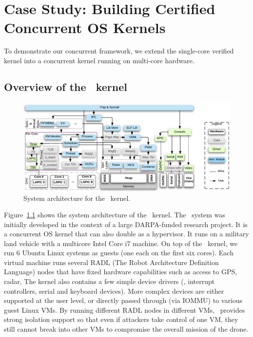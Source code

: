 \chapter{Case Study: Building Certified Concurrent OS Kernels}
\label{chap:conkernel}

To demonstrate our concurrent framework,
we extend the \mCTOS{} single-core verified kernel into a
concurrent kernel \cCTOS{} running on multi-core hardware.

\section{Overview of the \cCTOS\ kernel}
\label{sec:con:overview}

\begin{figure}[t]\centering
\includegraphics[scale=.78]{figs/sysarch}
\caption{System architecture for the \cCTOS\ kernel.}
\label{fig:sysarch}
\hrulefill
\end{figure}

Figure~\ref{fig:sysarch} shows the system architecture of the
\cCTOS\ kernel. The \cCTOS\ system was initially developed in the
context of a large DARPA-funded research project.  
It is a concurrent
OS kernel that can also double as a hypervisor.  It runs on a military
land vehicle with a multicore Intel Core i7 machine. On top of the
\cCTOS\ kernel, we run 6 Ubuntu Linux systems as guests (one each on
the first six cores). Each virtual machine runs several RADL (The
Robot Architecture Definition Language) nodes that have fixed hardware
capabilities such as access to GPS, radar, \etc{}  The kernel also
contains a few simple device drivers (\eg, interrupt controllers,
serial and keyboard devices). More complex devices are either
supported at the user level, or directly passed through (via
IOMMU) to various guest Linux VMs. By running different RADL nodes in
different VMs, \cCTOS\ provides strong isolation support so that even
if attackers take control of one VM, they still cannot break into
other VMs to compromise the overall mission of the drone.

